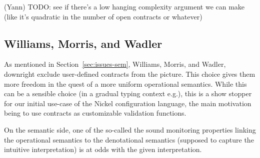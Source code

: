 \documentclass[sigplan,10pt,review,anonymous]{acmart}
\newcommand{\unsure}[2][1=]{}
\newcommand{\resolved}[2]{}
\newcommand{\nickel}[1]{\lstinline[language=nickel]{#1}}
\begin{document}
%
\resolved{(Yann) Is it really a
    problem per se? It is common thing to do (a nice declarative system
    for proofs and an algorithmic one for implementation, proved equivalent).
    Maybe the point is that the algorithmic system is way more complex than the
declarative one
(Teo) reworded}.
\resolved{(Yann) I think we need to substantiate this claim. If this
context dependency explains why CSE is invalid, maybe have a little example?
(Teo) I removed it, I don't think there's an example, mainly since
this context dependency is not part of the language. I do think it complicates
implementation of said feature}
\todo{(Yann) TODO: see if there's a low hanging complexity
    argument we can make (like it's quadratic in the number of open contracts or
whatever)}

\subsection{Williams, Morris, and Wadler}
\label{sec:will-morr-wadl}
\unsure{Subsection title?}

As mentioned in Section~\ref{sec:issues-sem}, Williams, Morris, and Wadler,
downright exclude user-defined contracts from the picture. This choice gives
them more freedom in the quest of a more uniform operational semantics. While
this can be a sensible choice (in a gradual typing context e.g.), this is a show
stopper for our initial use-case of the Nickel configuration language, the main
motivation being to use contracts as customizable validation functions.

On the semantic side, one of the so-called the sound monitoring properties
linking the operational semantics to the denotational semantics (supposed to
capture the intuitive interpretation) is at odds with the given interpretation.
\end{document}
